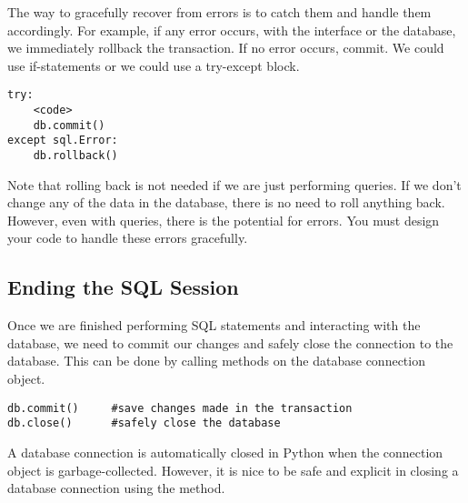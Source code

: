 The way to gracefully recover from errors is to catch them and handle them accordingly.  For example, if any error occurs, with the interface or the database, we immediately rollback the transaction.  If no error occurs, commit.  We could use if-statements or we could use a try-except block.
\begin{lstlisting}
try:
    <code>
    db.commit()
except sql.Error:
    db.rollback()
\end{lstlisting}
Note that rolling back is not needed if we are just performing queries.
If we don't change any of the data in the database, there is no need to roll anything back.  However, even with queries, there is the potential for errors.  You must design your code to handle these errors gracefully.

\subsection*{Ending the SQL Session}
Once we are finished performing SQL statements and interacting with the database, we need to commit our changes and safely close the connection
to the database.
This can be done by calling methods on the database connection object.
\begin{lstlisting}
db.commit()     #save changes made in the transaction
db.close()      #safely close the database
\end{lstlisting}

A database connection is automatically closed in Python when the connection object is garbage-collected.  However, it is nice to be safe and explicit in closing a database connection using the  method.

\let\undefined\lsql 
